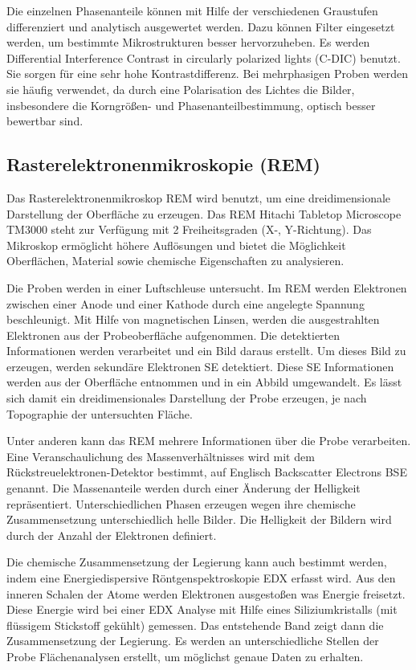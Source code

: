 Die einzelnen Phasenanteile können mit Hilfe der verschiedenen Graustufen differenziert und analytisch ausgewertet werden. Dazu können Filter eingesetzt werden, um bestimmte Mikrostrukturen besser hervorzuheben. Es werden Differential Interference Contrast in circularly polarized lights (C-DIC) benutzt. Sie sorgen für eine sehr hohe Kontrastdifferenz. Bei mehrphasigen Proben werden sie häufig verwendet, da durch eine Polarisation des Lichtes die Bilder, insbesondere die Korngrößen- und Phasenanteilbestimmung, optisch besser bewertbar sind.

\subsection{Rasterelektronenmikroskopie (REM)}

Das Rasterelektronenmikroskop REM wird benutzt, um eine dreidimensionale Darstellung der Oberfläche zu erzeugen. Das REM Hitachi Tabletop Microscope TM3000 steht zur Verfügung mit 2 Freiheitsgraden (X-, Y-Richtung). Das Mikroskop ermöglicht höhere Auflösungen und bietet die Möglichkeit Oberflächen, Material sowie chemische Eigenschaften zu analysieren. 

Die Proben werden in einer Luftschleuse untersucht. Im REM werden Elektronen zwischen einer Anode und einer Kathode durch eine angelegte Spannung beschleunigt. Mit Hilfe von magnetischen Linsen, werden die ausgestrahlten Elektronen aus der Probeoberfläche aufgenommen. Die detektierten Informationen werden verarbeitet und ein Bild daraus erstellt. Um dieses Bild zu erzeugen, werden sekundäre Elektronen SE detektiert. Diese SE Informationen werden aus der Oberfläche entnommen und in ein Abbild umgewandelt. Es lässt sich damit ein dreidimensionales Darstellung der Probe erzeugen, je nach Topographie der untersuchten Fläche.

Unter anderen kann das REM mehrere Informationen über die Probe verarbeiten. Eine Veranschaulichung des Massenverhältnisses wird mit dem Rückstreuelektronen-Detektor bestimmt, auf Englisch Backscatter Electrons BSE genannt. Die Massenanteile werden durch einer Änderung der Helligkeit repräsentiert. Unterschiedlichen Phasen erzeugen wegen ihre chemische Zusammensetzung unterschiedlich helle Bilder. Die Helligkeit der Bildern wird durch der Anzahl der Elektronen definiert.

Die chemische Zusammensetzung der Legierung kann auch bestimmt werden, indem eine Energiedispersive Röntgenspektroskopie EDX erfasst wird. Aus den inneren Schalen der Atome werden Elektronen ausgestoßen was Energie freisetzt. Diese Energie wird bei einer EDX Analyse mit Hilfe eines Siliziumkristalls (mit flüssigem Stickstoff gekühlt) gemessen. Das entstehende Band zeigt dann die Zusammensetzung der Legierung. Es werden an unterschiedliche Stellen der Probe Flächenanalysen erstellt, um möglichst genaue Daten zu erhalten.

